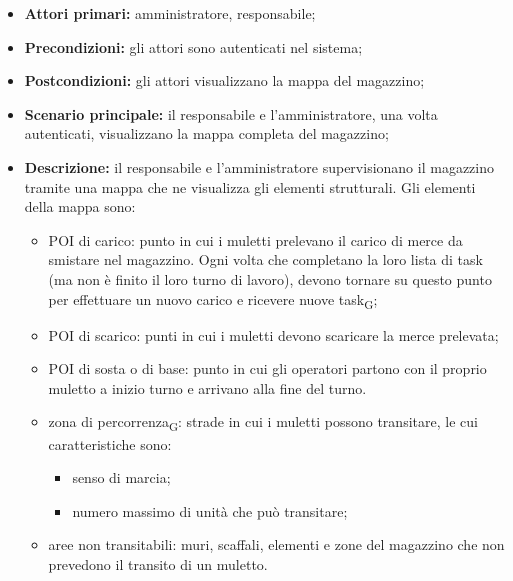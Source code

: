 \begin{itemize}
	\item 	\textbf{Attori primari:} amministratore, responsabile;
	\item 	\textbf{Precondizioni:} gli attori sono autenticati nel sistema;
	\item 	\textbf{Postcondizioni:} gli attori visualizzano la mappa del magazzino;
	\item 	\textbf{Scenario principale:} il responsabile e l'amministratore, una volta autenticati, visualizzano la mappa completa del magazzino;
	\item 	\textbf{Descrizione:} il responsabile e l'amministratore supervisionano il magazzino tramite una mappa che ne visualizza gli elementi strutturali. Gli elementi della mappa sono:
	\begin{itemize}
		\item POI di carico:  punto in cui i muletti prelevano il carico di merce da smistare nel magazzino. Ogni volta che completano la loro lista di task (ma non è finito il loro turno di lavoro), devono tornare su questo punto per effettuare un nuovo carico e ricevere nuove task\textsubscript{G};
		\item POI di scarico: punti in cui i muletti devono scaricare la merce prelevata;
		\item POI di sosta o di base: punto in cui gli operatori partono con il proprio muletto a inizio turno e arrivano alla fine del turno.
		\item zona di percorrenza\textsubscript{G}: strade in cui i muletti possono transitare, le cui caratteristiche sono:
		\begin{itemize}
			\item senso di marcia;
			\item numero massimo di unità che può transitare;
		\end{itemize}
		\item aree non transitabili: muri, scaffali, elementi e zone del magazzino che non prevedono il transito di un muletto.
	\end{itemize}

\end{itemize}


